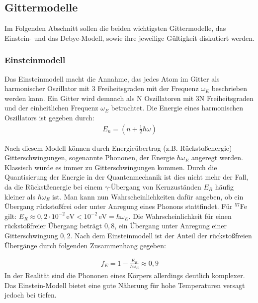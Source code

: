 
\subsection{Gittermodelle}

Im Folgenden Abschnitt sollen die beiden wichtigsten Gittermodelle, das Einstein- und das Debye-Modell, sowie ihre jeweilige Gültigkeit diskutiert werden.\cite{morris}

\subsubsection{Einsteinmodell}

Das Einsteinmodell macht die Annahme, das jedes Atom im Gitter als harmonischer Oszillator mit 3 Freiheitsgraden mit der Frequenz $\omega_E$ beschrieben werden kann. Ein Gitter wird demnach als N Oszillatoren mit 3N Freiheitsgraden und der einheitlichen Frequenz  $\omega_E$ betrachtet. Die Energie eines harmonischen Oszillators ist gegeben durch:
\begin{align}
E_n=\left( n+\frac{1}{2}\hbar\omega\right) 
\end{align} 

Nach diesem Modell können durch Energieübertrag  (z.B. Rückstoßenergie)  Gitterschwingungen, sogenannte Phononen, der Energie $\hbar \omega_E$ angeregt werden. Klassisch würde es immer zu Gitterschwingungen kommen. Durch die Quantisierung der Energie in der Quantenmechanik ist dies nicht mehr der Fall, da die Rückstßenergie bei einem $\gamma$-Übergang von Kernzuständen $E_R$ häufig kleiner als $\hbar \omega_E$ ist. Man kann nun Wahrscheinlichkeiten dafür angeben, ob ein Übergang rückstoßfrei oder unter Anregung eines Phonons stattfindet. Für  $^{57}$Fe gilt:
$E_R\approx0,2\cdot10^{-2}\,\mathrm{eV} < 10^{-2}\,\mathrm{eV}=\hbar\omega_E $. Die Wahrscheinlichkeit für einen rückstoßfreier Übergang beträgt $0,8$, ein Übergang unter Anregung einer Gitterschwingung $0,2$. Nach dem Einsteinmodell ist der Anteil der rückstoßfreien Übergänge durch folgenden Zusammenhang gegeben:

\begin{align}
f_E = 1-\frac{E_R}{\hbar \omega_E}\approx0,9
\end{align}
In der Realität sind die Phononen eines Körpers allerdings deutlich komplexer. Das Einstein-Modell bietet eine gute Näherung für hohe Temperaturen versagt jedoch bei tiefen.

